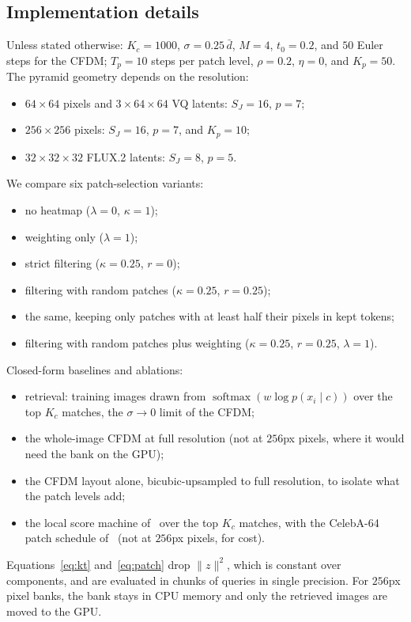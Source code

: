 \subsection{Implementation details}
\label{sec:impl}

Unless stated otherwise: $K_c=1000$, $\sigma=0.25\,\bar d$, $M=4$, $t_0=0.2$, and $50$ Euler steps for the CFDM; $T_p=10$ steps per patch level, $\rho=0.2$, $\eta=0$, and $K_p=50$. The pyramid geometry depends on the resolution:
\begin{itemize}
  \item $64\times64$ pixels and $3\times64\times64$ VQ latents: $S_J=16$, $p=7$;
  \item $256\times256$ pixels: $S_J=16$, $p=7$, and $K_p=10$;
  \item $32\times32\times32$ FLUX.2 latents: $S_J=8$, $p=5$.
\end{itemize}
We compare six patch-selection variants:
\begin{itemize}
  \item no heatmap ($\lambda=0$, $\kappa=1$);
  \item weighting only ($\lambda=1$);
  \item strict filtering ($\kappa=0.25$, $r=0$);
  \item filtering with random patches ($\kappa=0.25$, $r=0.25$);
  \item the same, keeping only patches with at least half their pixels in kept tokens;
  \item filtering with random patches plus weighting ($\kappa=0.25$, $r=0.25$, $\lambda=1$).
\end{itemize}
Closed-form baselines and ablations:
\begin{itemize}
  \item retrieval: training images drawn from $\operatorname{softmax}(w\log p(x_i\mid c))$ over the top $K_c$ matches, the $\sigma\to0$ limit of the CFDM;
  \item the whole-image CFDM at full resolution (not at $256$px pixels, where it would need the bank on the GPU);
  \item the CFDM layout alone, bicubic-upsampled to full resolution, to isolate what the patch levels add;
  \item the local score machine of~\cite{kamb2024analytic} over the top $K_c$ matches, with the CelebA-64 patch schedule of~\cite{lukoianov2025locality} (not at $256$px pixels, for cost).
\end{itemize} Equations~\eqref{eq:kt} and~\eqref{eq:patch} drop $\lVert z\rVert^2$, which is constant over components, and are evaluated in chunks of queries in single precision. For $256$px pixel banks, the bank stays in CPU memory and only the retrieved images are moved to the GPU.

